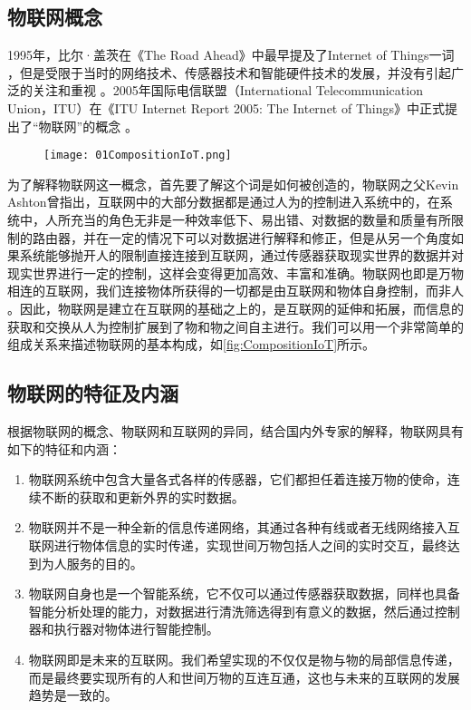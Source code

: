 	\subsection{物联网概念}
1995年，比尔·盖茨在《The Road Ahead》中最早提及了Internet of Things一词\supercite{BillGate1995} ，但是受限于当时的网络技术、传感器技术和智能硬件技术的发展，并没有引起广泛的关注和重视\supercite{HeYong2016} 。2005年国际电信联盟（International Telecommunication Union，ITU）在《ITU Internet Report 2005: The Internet of Things》中正式提出了“物联网”的概念\supercite{HeYong2016,ITU2005} 。
	\begin{figure}[!htp]
  		\centering
 		\texttt{[image: 01CompositionIoT.png]}
	\end{figure}
为了解释物联网这一概念，首先要了解这个词是如何被创造的，物联网之父Kevin Ashton曾指出，互联网中的大部分数据都是通过人为的控制进入系统中的，在系统中，人所充当的角色无非是一种效率低下、易出错、对数据的数量和质量有所限制的路由器，并在一定的情况下可以对数据进行解释和修正，但是从另一个角度如果系统能够抛开人的限制直接连接到互联网，通过传感器获取现实世界的数据并对现实世界进行一定的控制，这样会变得更加高效、丰富和准确。物联网也即是万物相连的互联网，我们连接物体所获得的一切都是由互联网和物体自身控制，而非人\supercite{Peter2015} 。因此，物联网是建立在互联网的基础之上的，是互联网的延伸和拓展，而信息的获取和交换从人为控制扩展到了物和物之间自主进行。我们可以用一个非常简单的组成关系来描述物联网的基本构成，如\ref{fig:CompositionIoT}所示。
	
	\subsection{物联网的特征及内涵}
根据物联网的概念、物联网和互联网的异同，结合国内外专家的解释，物联网具有如下的特征和内涵：
	\begin{enumerate}
  		\item 物联网系统中包含大量各式各样的传感器，它们都担任着连接万物的使命，连续不断的获取和更新外界的实时数据。
  		\item 物联网并不是一种全新的信息传递网络，其通过各种有线或者无线网络接入互联网进行物体信息的实时传递，实现世间万物包括人之间的实时交互，最终达到为人服务的目的。
  		\item 物联网自身也是一个智能系统，它不仅可以通过传感器获取数据，同样也具备智能分析处理的能力，对数据进行清洗筛选得到有意义的数据，然后通过控制器和执行器对物体进行智能控制。
  		\item 物联网即是未来的互联网。我们希望实现的不仅仅是物与物的局部信息传递，而是最终要实现所有的人和世间万物的互连互通，这也与未来的互联网的发展趋势是一致的。
	\end{enumerate}
	
